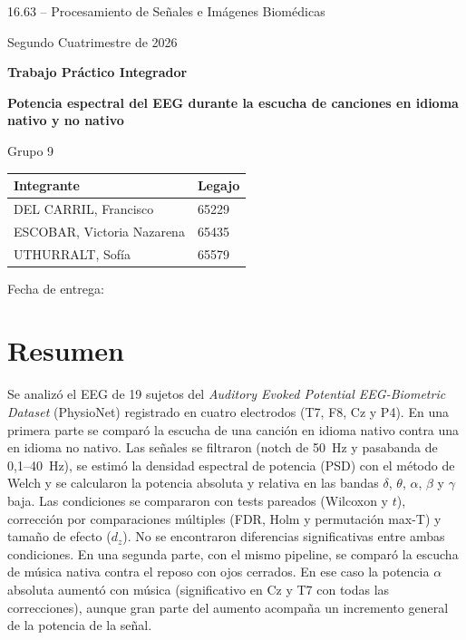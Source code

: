 \documentclass[11pt,a4paper]{article}
\begin{document}

\begin{titlepage}
  \centering
  {\large 16.63 -- Procesamiento de Señales e Imágenes Biomédicas\par}
  \vspace{0.3cm}
  {\large Segundo Cuatrimestre de 2026\par}
  \vspace{2.5cm}
  {\Large\bfseries Trabajo Práctico Integrador\par}
  \vspace{0.5cm}
  {\LARGE\bfseries Potencia espectral del EEG durante la escucha de canciones en idioma nativo y no nativo\par}
  \vspace{2.5cm}
  {\large Grupo 9\par}
  \vspace{0.8cm}
  \begin{tabular}{ll}
    \toprule
    \textbf{Integrante} & \textbf{Legajo} \\
    \midrule
    DEL CARRIL, Francisco & 65229 \\
    ESCOBAR, Victoria Nazarena & 65435 \\
    UTHURRALT, Sofía & 65579 \\
    \bottomrule
  \end{tabular}
  \vfill
  {Fecha de entrega: \underline{\hspace{3cm}}\par}
\end{titlepage}

\tableofcontents
\newpage

\section*{Resumen}
Se analizó el EEG de 19 sujetos del \textit{Auditory Evoked Potential EEG-Biometric Dataset} (PhysioNet) registrado en cuatro electrodos (T7, F8, Cz y P4). En una primera parte se comparó la escucha de una canción en idioma nativo contra una en idioma no nativo. Las señales se filtraron (notch de 50~Hz y pasabanda de 0,1--40~Hz), se estimó la densidad espectral de potencia (PSD) con el método de Welch y se calcularon la potencia absoluta y relativa en las bandas $\delta$, $\theta$, $\alpha$, $\beta$ y $\gamma$ baja. Las condiciones se compararon con tests pareados (Wilcoxon y $t$), corrección por comparaciones múltiples (FDR, Holm y permutación max-T) y tamaño de efecto ($d_z$). No se encontraron diferencias significativas entre ambas condiciones. En una segunda parte, con el mismo pipeline, se comparó la escucha de música nativa contra el reposo con ojos cerrados. En ese caso la potencia $\alpha$ absoluta aumentó con música (significativo en Cz y T7 con todas las correcciones), aunque gran parte del aumento acompaña un incremento general de la potencia de la señal.
\end{document}
